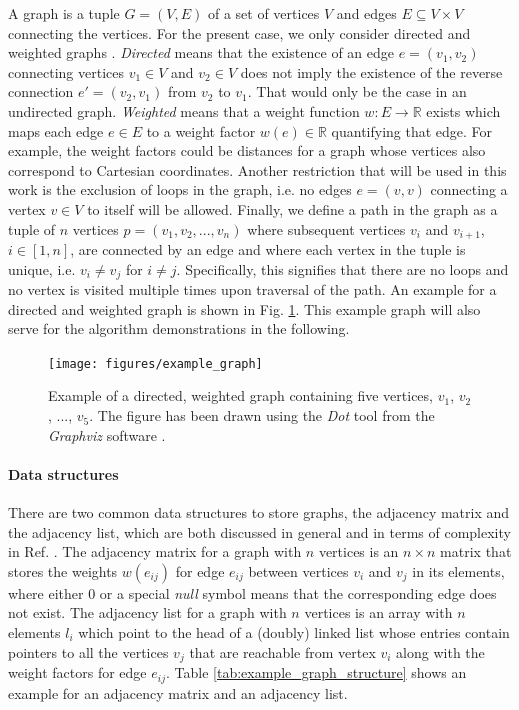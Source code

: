A graph is a tuple $G = \left(V, E\right)$ of a set of vertices $V$ and edges $E \subseteq V \times V$ 
connecting the vertices. For the present case, we only consider directed and weighted graphs 
\cite[pp. 1-3]{FUH_algo_graphs_2021}.
\textit{Directed} means that the existence of an edge $e = \left(v_1, v_2\right)$ connecting vertices 
$v_1 \in V$ and $v_2 \in V$ does not imply the existence of the reverse connection $e'= \left(v_2, v_1\right)$
from $v_2$ to $v_1$. That would only be the case in an undirected graph.
\textit{Weighted} means that a weight function $w: E \rightarrow \mathbb{R}$ exists which maps each 
edge $e \in E$ to a weight factor $w\left(e\right) \in \mathbb{R}$ quantifying that edge. 
For example, the weight factors could be distances for a graph whose vertices also correspond to Cartesian coordinates.
Another restriction that will be used in this work is the exclusion of loops in the graph, i.e.
no edges $e = \left(v, v\right)$ connecting a vertex $v \in V$ to itself will be allowed.
Finally, we define a path in the graph as a tuple of $n$ vertices $p = \left(v_1, v_2, ..., v_n\right)$
where subsequent vertices $v_i$ and $v_{i+1}$, $i \in \left[1, n\right]$, are connected by an edge and 
where each vertex in the tuple is unique, i.e. $v_i \neq v_j$ for $i \neq j$.
Specifically, this signifies that there are no loops and no vertex is visited multiple times upon 
traversal of the path.
An example for a directed and weighted graph is shown in Fig. \ref{fig:example_graph}.
This example graph will also serve for the algorithm demonstrations in the following.

\begin{figure}[h]
	\begin{center}
		\texttt{[image: figures/example\_graph]}
	\end{center}
	\caption[Example graph.]{
		Example of a directed, weighted graph containing five vertices, $v_1$, $v_2$, ..., $v_5$.
		The figure has been drawn using the \textit{Dot} tool from the \textit{Graphviz} software \cite{Ellson2003}.
		\label{fig:example_graph}}
\end{figure}


\paragraph{Data structures}
There are two common data structures to store graphs, the adjacency matrix and the adjacency list, which are
both discussed in general and in terms of complexity in Ref. \cite[Ch. 4.1.2, pp. 3-5]{FUH_algo_graphs_2021}.
The adjacency matrix for a graph with $n$ vertices is an $n \times n$ matrix that stores the 
weights $w\left(e_{ij}\right)$ for edge $e_{ij}$ between vertices $v_i$ and $v_j$ in its elements,
where either $0$ or a special \textit{null} symbol means that the corresponding edge does not exist.
The adjacency list for a graph with $n$ vertices is an array with $n$ elements $l_i$ which point 
to the head of a (doubly) linked list whose entries contain pointers to all the vertices $v_j$ that are reachable 
from vertex $v_i$ along with the weight factors for edge $e_{ij}$.
Table \ref{tab:example_graph_structure} shows an example for an adjacency matrix and an adjacency list.

